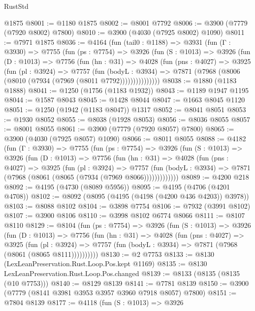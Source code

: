 \begin{lexlean}{RustStd}
\begin{coremodule}
    @1875
@8001 := @1180 @1875
@8002 := @8001 @7792
@8006 := @3900 (@7779 (@7920 @8002) @7800)
@8010 := @3900 (@4030 (@7925 @8002) @1090)
@8011 := @7971 @1875
@8036 := @4164
    (fun (tail0 : @1188) =>
    @3931
      (fun (Γ : @3930) =>
      @7755
        (fun (ps : @7754) =>
        @3926
          (fun (S : @1013) =>
          @3926
            (fun (D : @1013) =>
            @7756
              (fun (hn : @31) =>
              @4028
                (fun (pns : @4027) =>
                @3925
                  (fun (pl : @3924) =>
                  @7757
                    (fun (bodyL : @3934) =>
                    @7871 (@7968 (@8006 (@8010 (@7934 (@7969 (@8011 @7792)))))))))))))))
@8038 := @1880 (@1183 @1888)
@8041 := @1250 (@1756 (@1183 @1932))
@8043 := @1189 @1947 @1195
@8044 := @1587 @8043
@8045 := @1428 @8044
@8047 := @1663 @8045 @1120
@8051 := @1250 (@1942 (@1183 @8047)) @1317
@8052 := @8041 @8051
@8053 := @1930 @8052
@8055 := @8038 (@1928 @8053)
@8056 := @8036 @8055
@8057 := @8001 @8055
@8061 := @3900 (@7779 (@7920 @8057) @7800)
@8065 := @3900 (@4030 (@7925 @8057) @1090)
@8066 := @8011 @8055
@8088 := @4182
    (fun (Γ : @3930) =>
    @7755
      (fun (ps : @7754) =>
      @3926
        (fun (S : @1013) =>
        @3926
          (fun (D : @1013) =>
          @7756
            (fun (hn : @31) =>
            @4028
              (fun (pns : @4027) =>
              @3925
                (fun (pl : @3924) =>
                @7757
                  (fun (bodyL : @3934) =>
                  @7871 (@7968 (@8061 (@8065 (@7934 (@7969 @8066)))))))))))))
@8089 := @4200 @218
@8092 := @4195 (@4730 (@8089 @5956))
@8095 := @4195 (@4706 (@4201 @4708))
@8102 := @8092 (@8095 (@4195 (@4198 (@4200 @436 @4203)) @3978))
@8103 := @8088 @8102
@8104 := @3898 @7754
@8106 := @7932 (@3991 @8102)
@8107 := @3900 @8106
@8110 := @3998 @8102 @6774 @8066
@8111 := @8107 @8110
@8129 := @8104
    (fun (ps : @7754) =>
    @3926
      (fun (S : @1013) =>
      @3926
        (fun (D : @1013) =>
        @7756
          (fun (hn : @31) =>
          @4028
            (fun (pns : @4027) =>
            @3925
              (fun (pl : @3924) =>
              @7757 (fun (bodyL : @3934) => @7871 (@7968 (@8061 (@8065 @8111))))))))))
@8130 := @2 @7753
@8133 := @8130 (LexLeanPreservation.Rust.Loop.Pos.kept @1169)
@8135 := @8130 LexLeanPreservation.Rust.Loop.Pos.changed
@8139 := @8133 (@8135 (@8135 (@10 @7753)))
@8140 := @8129 @8139
@8141 := @7781 @8139
@8150 := @3900 (@7779 (@8141 @3981 @3953 @3957 @3960 @7918 @8057) @7800)
@8151 := @7804 @8139
@8177 := @4118
    (fun (S : @1013) =>
    @3926

\end{coremodule}
\end{lexlean}
